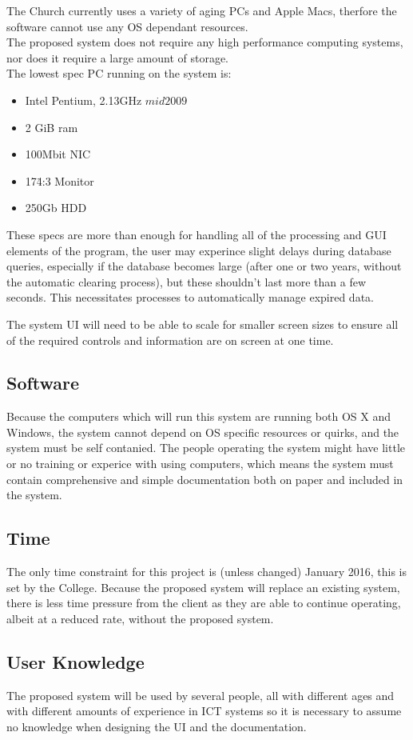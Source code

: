 	The Church currently uses a variety of aging PCs and Apple Macs, therfore the software cannot use any OS dependant resources.
	\\The proposed system does not require any high performance computing systems, nor does it require a large amount of storage.
	\\The lowest spec PC running on the system is:
	\begin{itemize}
		\item Intel Pentium, 2.13GHz \(mid 2009\)
		\item 2 GiB ram
		\item 100Mbit NIC
		\item 17\" 4:3 Monitor
		\item 250Gb HDD
	\end{itemize}
	These specs are more than enough for handling all of the processing and GUI elements of the program, the user may experince slight delays
	during database queries, especially if the database becomes large (after one or two years, without the automatic clearing process), but these
	shouldn't last more than a few seconds. This necessitates processes to automatically manage expired data.


	The system UI will need to be able to scale for smaller screen sizes to ensure all of the required controls and information are on screen at one time.


\subsection{Software}
	Because the computers which will run this system are running both OS X and Windows, the system cannot depend on OS specific resources or quirks,
	and the system must be self contanied. The people operating the system might have little or no training or experice with using computers, which
	means the system must contain comprehensive and simple documentation both on paper and included in the system.

\subsection{Time}
	The only time constraint for this project is (unless changed) January 2016, this is set by the College. Because the proposed system will replace
	an existing system, there is less time pressure from the client as they are able to continue operating, albeit at a reduced rate, without the proposed system.

\subsection{User Knowledge}
	The proposed system will be used by several people, all with different ages and with different amounts of experience in ICT systems so it is necessary
	to assume no knowledge when designing the UI and the documentation.


